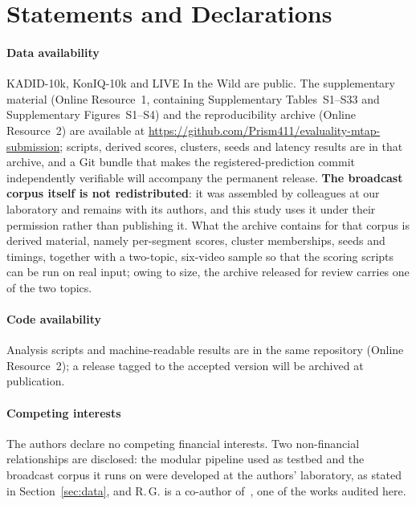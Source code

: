 \documentclass[sn-basic,Numbered]{sn-jnl}
\begin{document}

\maketitle








\section*{Statements and Declarations}

\paragraph{Data availability}
KADID-10k, KonIQ-10k and LIVE In the Wild are public. The supplementary material
(Online Resource~1, containing Supplementary Tables~S1--S33 and Supplementary
Figures~S1--S4) and the reproducibility archive (Online Resource~2) are available at
\url{https://github.com/Prism411/evaluality-mtap-submission}; scripts, derived scores,
clusters, seeds and latency results are in that archive, and a Git bundle that makes the
registered-prediction commit independently verifiable will accompany the permanent
release. \textbf{The broadcast corpus
itself is not redistributed}: it was assembled by colleagues at our laboratory and
remains with its authors, and this study uses it under their permission rather than
publishing it. What the archive contains for that corpus is derived material,
namely per-segment scores, cluster memberships, seeds and timings, together with a
two-topic, six-video sample so that the scoring scripts can be run on real input;
owing to size, the archive released for review carries one of the two topics.

\paragraph{Code availability}
Analysis scripts and machine-readable results are in the same repository (Online
Resource~2); a release tagged to the accepted version will be archived at publication.

\paragraph{Competing interests}
The authors declare no competing financial interests. Two non-financial relationships are
disclosed: the modular pipeline used as testbed and the broadcast corpus it runs on were
developed at the authors' laboratory, as stated in Section~\ref{sec:data}, and R.\,G. is a
co-author of~\citep{barbieri2021content}, one of the works audited here.
\end{document}
